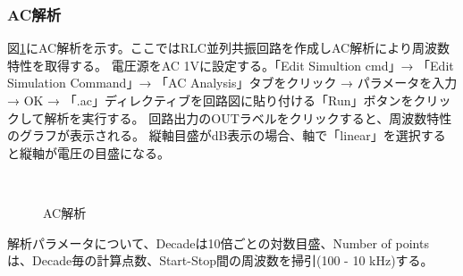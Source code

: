 \subsubsection{AC解析}
    図\ref{ac}にAC解析を示す。ここではRLC並列共振回路を作成しAC解析により周波数特性を取得する。
    電圧源をAC 1Vに設定する。「Edit Simultion cmd」→ 「Edit Simulation Command」→ 「AC Analysis」タブをクリック → パラメータを入力 → OK → 「.ac」ディレクティブを回路図に貼り付ける「Run」ボタンをクリックして解析を実行する。
    回路出力のOUTラベルをクリックすると、周波数特性のグラフが表示される。
    縦軸目盛がdB表示の場合、軸で「linear」を選択すると縦軸が電圧の目盛になる。
    \begin{figure}[htb]
      \begin{center}
      ~
      \caption{AC解析}
      \label{ac}
      \end{center}
    \end{figure}
    解析パラメータについて、Decadeは10倍ごとの対数目盛、Number of points は、Decade毎の計算点数、Start-Stop間の周波数を掃引(100 - 10 kHz)する。

